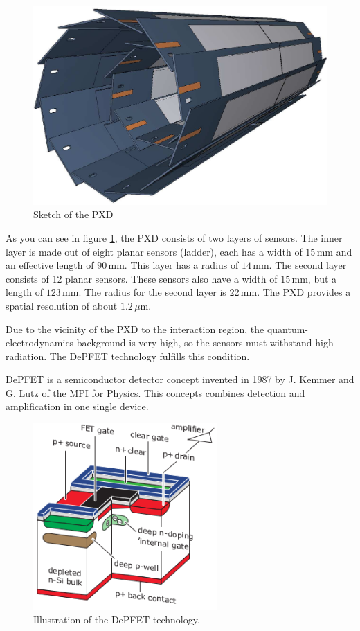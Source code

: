\documentclass[a4paper,11pt,twosided,final,german,openbib,pdftex,listof=totoc,bibliography=totoc]{scrbook}
\begin{document}
\begin{figure}[h!]
	\begin{center}
		\includegraphics[width=12cm]{Bilder/pixel}
	\end{center}
	\caption[Pixel Detector]{Sketch of the PXD \cite{B2TR}}
	\label{fig:pxd}
\end{figure}

As you can see in figure \ref{fig:pxd}, the PXD consists of two layers of sensors. The inner layer is made out of eight planar sensors (ladder), each has a width of $15\,\textrm{mm}$ and an effective length of $90\,\textrm{mm}$. This layer has a radius of $14\,\textrm{mm}$. The second layer consists of 12 planar sensors. These sensors also have a width of $15\,\textrm{mm}$, but a length of $123\,\textrm{mm}$. The radius for the second layer is $22\,\textrm{mm}$. The PXD provides a spatial resolution of about $1.2\,\mu\textrm{m}$.\cite{B2TR}

Due to the vicinity of the PXD to the interaction region, the quantum-electrodynamics background is very high, so the sensors  must withstand high radiation. The DePFET technology fulfills this condition. \cite{B2TR} \cite{MARINAS201159}
\newline 

DePFET is a semiconductor detector concept invented in 1987 by J. Kemmer and G. Lutz of the MPI for Physics. This concepts combines detection and amplification in one single device. \cite{B2TR}

\begin{figure}[h!]
	\begin{center}
		\includegraphics[width=7cm]{Bilder/DEPFET}
	\end{center}
\caption[DePFET]{Illustration of the DePFET technology.\cite{B2TR}}
\label{fig:DePFET}
\end{figure}
\end{document}
